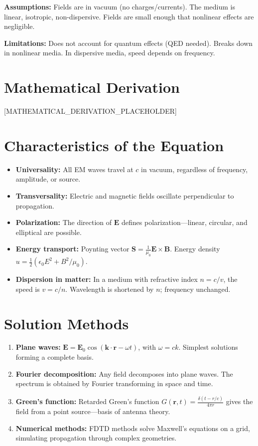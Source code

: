 \documentclass[11pt,openright]{book}
\begin{document}
\textbf{Assumptions:} Fields are in vacuum (no charges/currents). The medium is linear, isotropic, non-dispersive. Fields are small enough that nonlinear effects are negligible.


\textbf{Limitations:} Does not account for quantum effects (QED needed). Breaks down in nonlinear media. In dispersive media, speed depends on frequency.


\section*{Mathematical Derivation}

[MATHEMATICAL_DERIVATION_PLACEHOLDER]

\section*{Characteristics of the Equation}

\begin{itemize}
\item \textbf{Universality:} All EM waves travel at $c$ in vacuum, regardless of frequency, amplitude, or source.
\item \textbf{Transversality:} Electric and magnetic fields oscillate perpendicular to propagation.
\item \textbf{Polarization:} The direction of $\mathbf{E}$ defines polarization---linear, circular, and elliptical are possible.
\item \textbf{Energy transport:} Poynting vector $\mathbf{S} = \frac{1}{\mu_0}\mathbf{E} \times \mathbf{B}$. Energy density $u = \frac{1}{2}(\epsilon_0 E^2 + B^2/\mu_0)$.
\item \textbf{Dispersion in matter:} In a medium with refractive index $n = c/v$, the speed is $v = c/n$. Wavelength is shortened by $n$; frequency unchanged.
\end{itemize}
\section*{Solution Methods}

\begin{enumerate}
\item \textbf{Plane waves:} $\mathbf{E} = \mathbf{E}_0 \cos(\mathbf{k} \cdot \mathbf{r} - \omega t)$, with $\omega = ck$. Simplest solutions forming a complete basis.
\item \textbf{Fourier decomposition:} Any field decomposes into plane waves. The spectrum is obtained by Fourier transforming in space and time.
\item \textbf{Green's function:} Retarded Green's function $G(\mathbf{r}, t) = \frac{\delta(t - r/c)}{4\pi r}$ gives the field from a point source---basis of antenna theory.
\item \textbf{Numerical methods:} FDTD methods solve Maxwell's equations on a grid, simulating propagation through complex geometries.
\end{enumerate}
\end{document}
